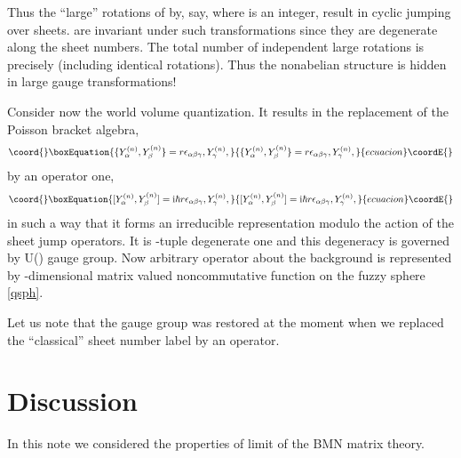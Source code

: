 \documentclass[a4paper]{article}
\providecommand{\ii}{\mathrm{i}}
\begin{document}
Thus the ``large'' rotations of \myHighlight{$\varphi$}\coordHE{} by, say, \coordHE{} where
\coordHE{} is an integer, result in cyclic jumping over \coordHE{} sheets.
\coordHE{} are invariant under such transformations since they are
degenerate along the sheet numbers. The total number of
independent large rotations is precisely \coordHE{} (including
identical rotations). Thus the nonabelian structure is hidden in
large gauge transformations!

Consider now the world volume quantization. It results in the
replacement of the Poisson bracket algebra,
\begin{equation}\coord{}\boxEquation{
\{Y_\alpha^{(n)},Y_\beta^{(n)}\}=r
\epsilon_{\alpha\beta\gamma},Y_\gamma^{(n)},
}{
\{Y_\alpha^{(n)},Y_\beta^{(n)}\}=r
\epsilon_{\alpha\beta\gamma},Y_\gamma^{(n)},
}{ecuacion}\coordE{}\end{equation}
by an operator one,
\begin{equation}\coord{}\boxEquation{\label{qsph}
[Y_\alpha^{(n)},Y_\beta^{(n)}]=\ii \hbar r
\epsilon_{\alpha\beta\gamma},Y_\gamma^{(n)},
}{[Y_\alpha^{(n)},Y_\beta^{(n)}]=\ii \hbar r
\epsilon_{\alpha\beta\gamma},Y_\gamma^{(n)},
}{ecuacion}\coordE{}\end{equation}
in such a way that it forms an irreducible representation modulo the
action of the sheet jump operators. It is \coordHE{}-tuple degenerate one and
this degeneracy is governed by U(\coordHE{}) gauge group. Now arbitrary
operator about the background \coordHE{} is represented by
\coordHE{}-dimensional matrix valued noncommutative function on the fuzzy
sphere \eqref{qsph}.

Let us note that the gauge group was restored at the moment when we
replaced the ``classical'' sheet number label by an operator.

\section{Discussion}
In this note we considered the properties of \coordHE{} limit of
the BMN matrix theory.
\end{document}
